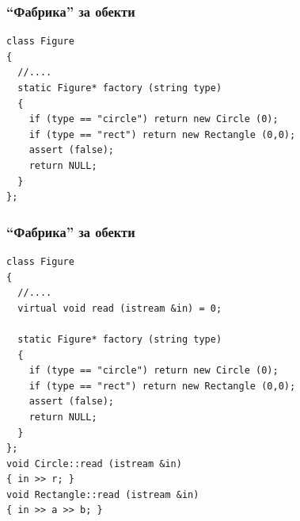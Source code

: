 \documentclass{beamer}
\begin{document}
\begin{frame}[fragile]
\frametitle{``Фабрика'' за обекти}


\begin{flushleft}
\begin{lstlisting}
class Figure
{
  //....
  static Figure* factory (string type)
  {
    if (type == "circle") return new Circle (0);
    if (type == "rect") return new Rectangle (0,0);
    assert (false);
    return NULL;
  }
};
\end{lstlisting}  
\end{flushleft}


\end{frame}


\begin{frame}[fragile]
\frametitle{``Фабрика'' за обекти}


\begin{flushleft}
\begin{lstlisting}
class Figure
{
  //....
  virtual void read (istream &in) = 0;

  static Figure* factory (string type)
  {
    if (type == "circle") return new Circle (0);
    if (type == "rect") return new Rectangle (0,0);
    assert (false);
    return NULL;
  }
};
void Circle::read (istream &in)
{ in >> r; }
void Rectangle::read (istream &in)
{ in >> a >> b; }
\end{lstlisting}  
\end{flushleft}


\end{frame}
\end{document}
